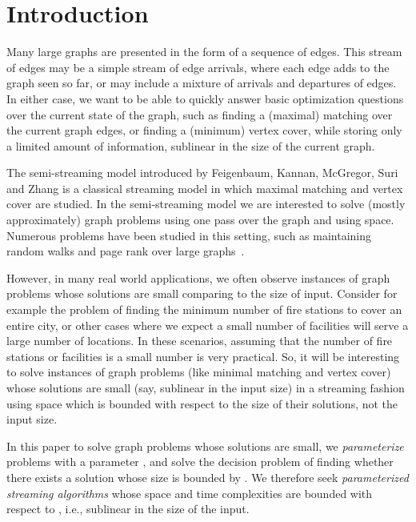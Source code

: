 \documentclass[11pt,letter]{article}
\begin{document}
\newpage

\section{Introduction}
Many large graphs are presented in the form of a sequence of edges.
This stream of edges may be a simple stream of edge arrivals, where
each edge adds to the graph seen so far, or may include a mixture of
arrivals and departures of edges.
In either case, we want to be able to quickly answer basic optimization
questions over the current state of the graph, such as finding a
(maximal) matching over the current graph edges, or finding a
(minimum) vertex cover, while storing only a limited amount of
information, sublinear in the size of the current graph.

The semi-streaming model introduced by
Feigenbaum, Kannan, McGregor, Suri and Zhang \cite{FKMSZ05}  is a classical
streaming model in which maximal matching and vertex cover are studied.
In the semi-streaming model we are interested to solve (mostly approximately) graph problems
using one pass over the graph and using  space.
Numerous problems have been studied in this setting, such as
maintaining random walks and page rank over large graphs~\cite{DGP08}.

However, in many real world applications, we often observe instances of graph problems
whose solutions are small comparing to the size of input. Consider for example
the problem of finding the minimum number of fire stations to cover an entire city,
or other cases where we expect a small number of facilities will serve
a large number of locations. In these scenarios, assuming that the number of fire
stations or facilities is a small number  is very practical. So, it will be interesting
to solve instances of graph problems (like minimal matching
and vertex cover) whose solutions are small (say, sublinear in the input size)
in a streaming fashion using space which is bounded with respect to
the size of their solutions, not the input size.




In this paper to solve graph problems whose solutions are small,
we {\em parameterize} problems with a parameter , and
solve the decision problem of finding whether there exists a solution whose size is bounded by .
We therefore seek \emph{parameterized streaming algorithms} whose space and time complexities
are bounded with respect to  , i.e.,  sublinear in the size of the input.
\end{document}
